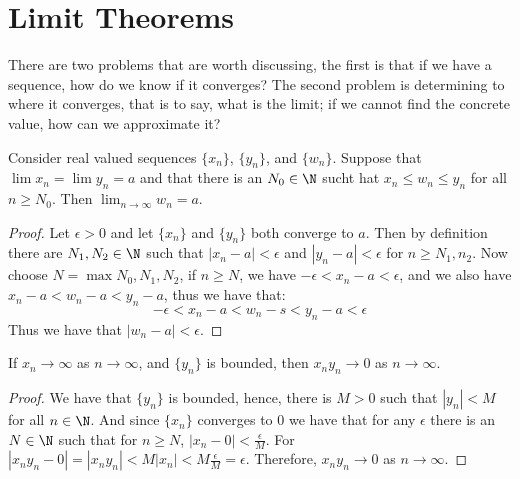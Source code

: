 
\section{Limit Theorems}

There are two problems that are worth discussing, the first is that if we have a sequence, how do we know if it converges? 
The second problem is determining to where it converges, that is to say, what is the limit; if we cannot find the concrete 
value, how can we approximate it?

\begin{theorem}\label{2.2.1}

    Consider real valued sequences $\{x_n\}$,  $\{y_n\}$, and  $\{w_n\}$. Suppose that $\lim{x_n}=\lim{y_n}=a$ and that there 
    is an $N_0 \in \N$ sucht hat  $x_n \leq w_n \leq y_n$ for all  $n \geq N_0$. Then  $\lim_{n \rightarrow \infty}{w_n}=a$. 
\end{theorem}
\begin{proof}
    Let $\epsilon>0$ and let  $\{x_n\}$ and  $\{y_n\}$ both converge to  $a$. Then by definition there are  $N_1,N_2 \in \N$ 
    such that $|x_n-a|<\epsilon$ and  $|y_n-a|<\epsilon$ for  $n \geq N_1,n_2$. Now choose $N=\max{N_0,N_1,N_2}$, if 
    $n \geq N$, we have  $-\epsilon<x_n-a<\epsilon$, and we also have  $x_n-a<w_n-a<y_n-a$, thus we have that:
        \begin{equation*}
            -\epsilon<x_n-a<w_n-s<y_n-a<\epsilon
        \end{equation*}
    Thus we have that $|w_n-a|<\epsilon$.
\end{proof}

\begin{corollary}
    If $x_n \rightarrow \infty$ as  $n \rightarrow \infty$, and  $\{y_n\}$ is bounded, then $x_ny_n \rightarrow 0$ as 
    $n \rightarrow \infty$.
\end{corollary}
\begin{proof}
    We have that $\{y_n\}$ is bounded, hence, there is $M>0$ such that  $|y_n|<M$ for all  $n \in \N$. And since $\{x_n\}$ 
    converges to $0$ we have that for any $\epsilon$ there is an  $N \in \N$ such that for  $n \geq N$,  $|x_n-0|<\frac{\epsilon}{M}$.
    For $|x_ny_n-0|=|x_ny_n|<M|x_n|<M\frac{\epsilon}{M}=\epsilon$. Therefore, $x_ny_n \rightarrow 0$ as  $n \rightarrow \infty$.
\end{proof}

